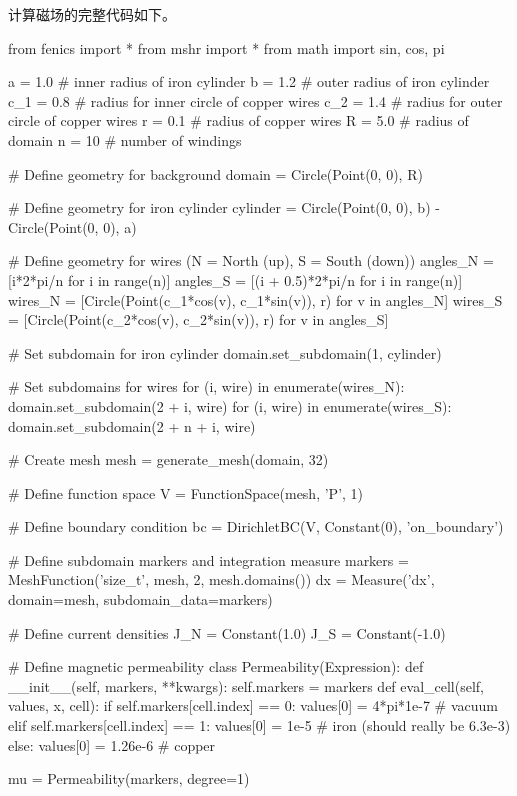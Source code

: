 计算磁场的完整代码如下。

\begin{python}
from fenics import *
from mshr import *
from math import sin, cos, pi

a = 1.0   # inner radius of iron cylinder
b = 1.2   # outer radius of iron cylinder
c_1 = 0.8 # radius for inner circle of copper wires
c_2 = 1.4 # radius for outer circle of copper wires
r = 0.1   # radius of copper wires
R = 5.0   # radius of domain
n = 10    # number of windings

# Define geometry for background
domain = Circle(Point(0, 0), R)

# Define geometry for iron cylinder
cylinder = Circle(Point(0, 0), b) - Circle(Point(0, 0), a)

# Define geometry for wires (N = North (up), S = South (down))
angles_N = [i*2*pi/n for i in range(n)]
angles_S = [(i + 0.5)*2*pi/n for i in range(n)]
wires_N = [Circle(Point(c_1*cos(v), c_1*sin(v)), r) for v in angles_N]
wires_S = [Circle(Point(c_2*cos(v), c_2*sin(v)), r) for v in angles_S]

# Set subdomain for iron cylinder
domain.set_subdomain(1, cylinder)

# Set subdomains for wires
for (i, wire) in enumerate(wires_N):
    domain.set_subdomain(2 + i, wire)
for (i, wire) in enumerate(wires_S):
    domain.set_subdomain(2 + n + i, wire)

# Create mesh
mesh = generate_mesh(domain, 32)

# Define function space
V = FunctionSpace(mesh, 'P', 1)

# Define boundary condition
bc = DirichletBC(V, Constant(0), 'on_boundary')

# Define subdomain markers and integration measure
markers = MeshFunction('size_t', mesh, 2, mesh.domains())
dx = Measure('dx', domain=mesh, subdomain_data=markers)

# Define current densities
J_N = Constant(1.0)
J_S = Constant(-1.0)

# Define magnetic permeability
class Permeability(Expression):
    def __init__(self, markers, **kwargs):
        self.markers = markers
    def eval_cell(self, values, x, cell):
        if self.markers[cell.index] == 0:
            values[0] = 4*pi*1e-7 # vacuum
        elif self.markers[cell.index] == 1:
            values[0] = 1e-5      # iron (should really be 6.3e-3)
        else:
            values[0] = 1.26e-6   # copper

mu = Permeability(markers, degree=1)


\end{python}
